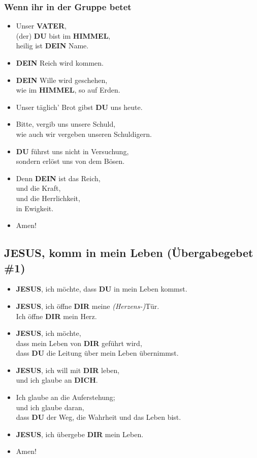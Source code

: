 \documentclass[12pt,a5paper]{article}
\newcommand{\Dein}[0]{\textbf{DEIN}}
\newcommand{\Dich}[0]{\textbf{DICH}}
\newcommand{\Dir}[0]{\textbf{DIR}}
\newcommand{\Du}[0]{\textbf{DU}}
\newcommand{\Himmel}[0]{\textbf{HIMMEL}}
\newcommand{\Jesus}[0]{\textbf{JESUS}}
\newcommand{\Vater}[0]{\textbf{VATER}}
\begin{document}
	\subsubsection{Wenn ihr in der Gruppe betet}
		\begin{itemize}[nosep]
			\item	Unser {\Vater},
			\\		(der) {\Du} bist im {\Himmel},
			\\		heilig ist {\Dein} Name.
			\item	{\Dein} Reich wird kommen.
			\item	{\Dein} Wille wird geschehen,
			\\		wie im {\Himmel},
					so auf Erden.
			\item	Unser t\"aglich' Brot gibst {\Du} uns heute.
			\item	Bitte,
					vergib uns unsere Schuld,
			\\		wie auch wir vergeben unseren Schuldigern.
			\item	{\Du} f\"uhrst uns nicht in Versuchung,
			\\		sondern erl\"ost uns von dem B\"osen.
			\item	Denn {\Dein} ist das Reich,
			\\		und die Kraft,
			\\		und die Herrlichkeit,
			\\		in Ewigkeit.
			\item	Amen!
		\end{itemize}

	\subsection{{\Jesus}, komm in mein Leben (\"Ubergabegebet \#1)}
		\begin{itemize}[nosep]
			\item	{\Jesus},
					ich m\"ochte,
					dass {\Du} in mein Leben kommst.
			\item	{\Jesus},
					ich \"offne {\Dir} meine \textit{(Herzens-)}T\"ur.
			\\		Ich \"offne {\Dir} mein Herz.
			\item	{\Jesus},
					ich m\"ochte,
			\\		dass mein Leben von {\Dir} gef\"uhrt wird,
			\\		dass {\Du} die Leitung \"uber mein Leben \"ubernimmst.
			\item	{\Jesus},
					ich will mit {\Dir} leben,
			\\		und ich glaube an {\Dich}.
			\item	Ich glaube an die Auferstehung;
			\\		und ich glaube daran,
			\\		dass {\Du} der Weg,
					die Wahrheit und das Leben bist.
			\item	{\Jesus},
					ich \"ubergebe {\Dir} mein Leben.
			\item	Amen!
		\end{itemize}
\end{document}
